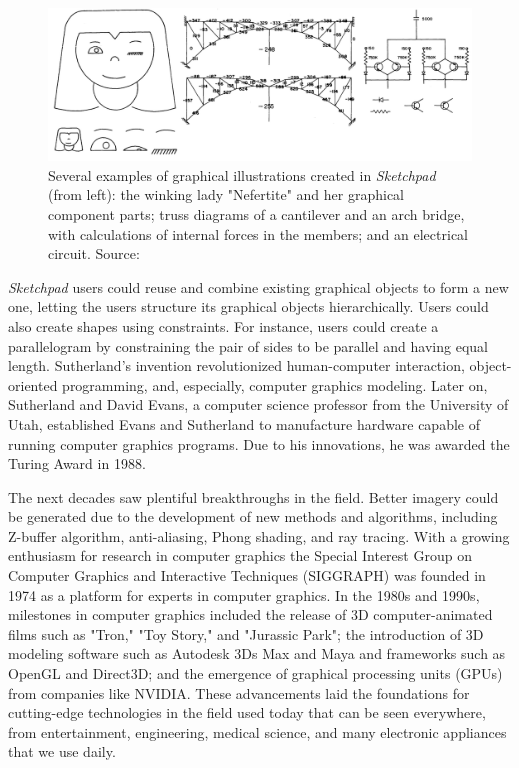 \documentclass[conference]{IEEEtran}
\begin{document}
\begin{figure}[htb!]
    \centering
    \includegraphics[width=1\linewidth]{sketchpad2.png}
    \caption{Several examples of graphical illustrations created in \textit{Sketchpad} (from left): the winking lady 
    "Nefertite" and her graphical component parts; truss diagrams of a cantilever and an arch bridge, with calculations 
    of internal forces in the members; and an electrical circuit. Source: \cite{sutherland}}
\end{figure}
\textit{Sketchpad} users could reuse and combine existing graphical objects to form a new one, letting the users structure its graphical objects hierarchically. Users could also create shapes using constraints. For instance, users could create a parallelogram by constraining the pair of sides to be parallel and having equal length. Sutherland's invention revolutionized human-computer interaction, object-oriented programming, and, especially, computer graphics modeling. Later on, Sutherland and David Evans, a computer science professor from the University of Utah, established Evans and Sutherland to manufacture hardware capable of running computer graphics programs. Due to his innovations, he was awarded the Turing Award in 1988\cite{acm}.


The next decades saw plentiful breakthroughs in the field. Better imagery could be generated due to the development of new methods and algorithms, including Z-buffer algorithm, anti-aliasing, Phong shading, and ray tracing\cite{history}. With a growing enthusiasm for research in computer graphics the Special Interest Group on Computer Graphics and Interactive Techniques (SIGGRAPH) was founded in 1974 as a platform for experts in computer graphics\cite{siggraph}. In the 1980s and 1990s, milestones in computer graphics included the release of 3D computer-animated films such as "Tron," "Toy Story," and "Jurassic Park"; the introduction of 3D modeling software such as Autodesk 3Ds Max and Maya and frameworks such as OpenGL and Direct3D; and the emergence of graphical processing units (GPUs) from companies like NVIDIA\cite{history}\cite{cgi-movie}. These advancements laid the foundations for cutting-edge technologies in the field used today that can be seen everywhere, from entertainment, engineering, medical science, and many electronic appliances that we use daily.
\end{document}
